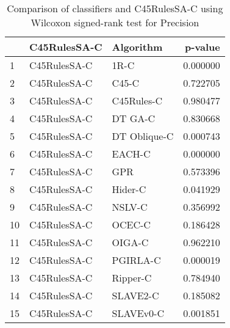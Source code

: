 \begin{table}
\footnotesize
\caption{Comparison of classifiers and C45RulesSA-C using Wilcoxon signed-rank test for Precision}
\label{tab:C45RulesSA-C wilcoxon Precision comparison}
\begin{tabular}{lllr}
\hline
 & C45RulesSA-C & Algorithm & p-value \\
\hline
1 & C45RulesSA-C & 1R-C & 0.000000 \\
2 & C45RulesSA-C & C45-C & 0.722705 \\
3 & C45RulesSA-C & C45Rules-C & 0.980477 \\
4 & C45RulesSA-C & DT GA-C & 0.830668 \\
5 & C45RulesSA-C & DT Oblique-C & 0.000743 \\
6 & C45RulesSA-C & EACH-C & 0.000000 \\
7 & C45RulesSA-C & GPR & 0.573396 \\
8 & C45RulesSA-C & Hider-C & 0.041929 \\
9 & C45RulesSA-C & NSLV-C & 0.356992 \\
10 & C45RulesSA-C & OCEC-C & 0.186428 \\
11 & C45RulesSA-C & OIGA-C & 0.962210 \\
12 & C45RulesSA-C & PGIRLA-C & 0.000019 \\
13 & C45RulesSA-C & Ripper-C & 0.784940 \\
14 & C45RulesSA-C & SLAVE2-C & 0.185082 \\
15 & C45RulesSA-C & SLAVEv0-C & 0.001851 \\
\hline
\end{tabular}
\end{table}
